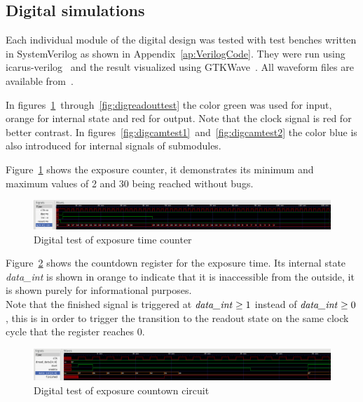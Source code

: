 \newpage
\subsection{Digital simulations}

Each individual module of the digital design was tested with test benches written in SystemVerilog as shown in Appendix~\ref{ap:VerilogCode}.
They were run using icarus-verilog~\cite{icarusVL} and the result visualized using GTKWave~\cite{gtkwave}.
All waveform files are available from~\cite{githubProject}.

In figures~\ref{fig:digexptest}~through~\ref{fig:digreadouttest} the color green was used for input, orange for internal state and red for output.
Note that the clock signal is red for better contrast.
In figures~\ref{fig:digcamtest1}~and~\ref{fig:digcamtest2} the color blue is also introduced for internal signals of submodules.

Figure~\ref{fig:digexptest} shows the exposure counter, it demonstrates its minimum and maximum values of 2 and 30 being reached without bugs.

\begin{figure}[H]
  \centering
  \includegraphics[width=\textwidth]{figures/expTest}
  \caption{Digital test of exposure time counter}
  \label{fig:digexptest}
\end{figure}

Figure~\ref{fig:digfcdtest} shows the countdown register for the exposure time. Its internal state \textit{data\_int} is shown in orange
to indicate that it is inaccessible from the outside, it is shown purely for informational purposes.\\
Note that the finished signal is triggered at $\text{\textit{data\_int}} \geq 1$ instead of $\text{\textit{data\_int}} \geq 0$,
this is in order to trigger the transition to the readout state on the same clock cycle that the register reaches 0.

\begin{figure}[H]
  \centering
  \includegraphics[width=\textwidth]{figures/fcdTest}
  \caption{Digital test of exposure countown circuit}
  \label{fig:digfcdtest}
\end{figure}

